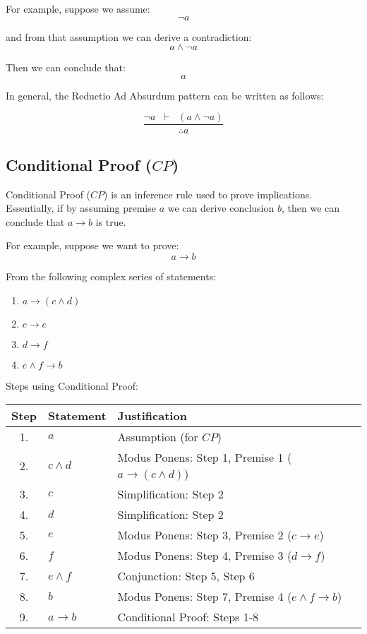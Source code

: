 \documentclass[12pt,a4paper,openany]{article}
\begin{document}
For example, suppose we assume:
\[\neg a\]

and from that assumption we can derive a contradiction:
\[a \land \neg a\]

Then we can conclude that:
\[a\]

In general, the Reductio Ad Absurdum pattern can be written as follows:

\[
\frac{\neg a \;\; \vdash \;\; (a \land \neg a)}{\therefore a}
\]

\subsection{Conditional Proof (\(CP\))}\label{conditional-proof-cp}

Conditional Proof (\(CP\)) is an inference rule used to prove implications. Essentially, if by assuming premise \(a\) we can derive conclusion \(b\), then we can conclude that \(a \rightarrow b\) is true.

For example, suppose we want to prove:
\[a \rightarrow b\]

From the following complex series of statements:

\begin{enumerate}
\item \(a \rightarrow (c \land d)\)
\item \(c \rightarrow e\)
\item \(d \rightarrow f\)
\item \(e \land f \rightarrow b\)
\end{enumerate}

Steps using Conditional Proof:

\begin{center}
\begin{tabular}{|c|l|l|}
\hline
\textbf{Step} & \textbf{Statement} & \textbf{Justification} \\
\hline
1. & \(a\) & Assumption (for \(CP\)) \\
2. & \(c \land d\) & Modus Ponens: Step 1, Premise 1 (\(a \rightarrow (c \land d)\)) \\
3. & \(c\) & Simplification: Step 2 \\
4. & \(d\) & Simplification: Step 2 \\
5. & \(e\) & Modus Ponens: Step 3, Premise 2 (\(c \rightarrow e\)) \\
6. & \(f\) & Modus Ponens: Step 4, Premise 3 (\(d \rightarrow f\)) \\
7. & \(e \land f\) & Conjunction: Step 5, Step 6 \\
8. & \(b\) & Modus Ponens: Step 7, Premise 4 (\(e \land f \rightarrow b\)) \\
9. & \(a \rightarrow b\) & Conditional Proof: Steps 1-8 \\
\hline
\end{tabular}
\end{center}
\end{document}
